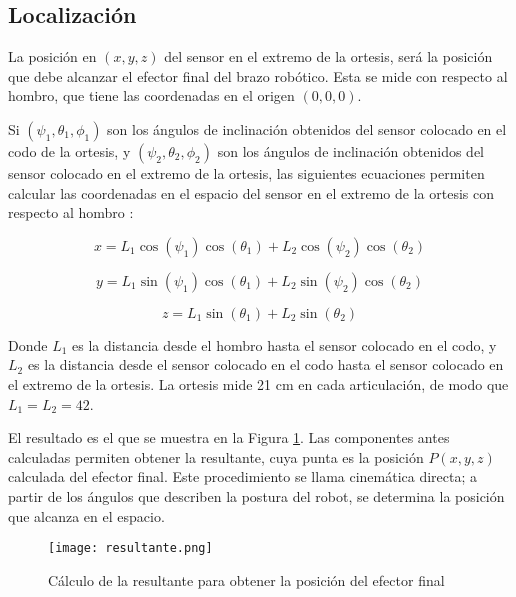 \subsection{Localización}

La posición en $(x, y, z)$ del sensor en el extremo de la ortesis, será la posición que debe alcanzar el efector final del brazo robótico. Esta se mide con respecto al hombro, que tiene las coordenadas en el origen $(0, 0 ,0)$.

Si $(\psi_{1}, \theta_{1}, \phi_{1})$ son los ángulos de inclinación obtenidos del sensor colocado en el codo de la ortesis, y $(\psi_{2}, \theta_{2}, \phi_{2})$ son los ángulos de inclinación obtenidos del sensor colocado en el extremo de la ortesis, las siguientes ecuaciones permiten calcular las coordenadas en el espacio del sensor en el extremo de la ortesis con respecto al hombro \cite{mathworks2025}:

\begin{equation}
x = L_1 \cos(\psi_1) \cos(\theta_1) + L_2 \cos(\psi_2) \cos(\theta_2)
\end{equation}

\begin{equation}
y = L_1 \sin(\psi_1) \cos(\theta_1) + L_2 \sin(\psi_2) \cos(\theta_2)
\end{equation}

\begin{equation}
z = L_1 \sin(\theta_1) + L_2 \sin(\theta_2)
\end{equation}

Donde $L_1$ es la distancia desde el hombro hasta el sensor colocado en el codo, y $L_2$ es la distancia desde el sensor colocado en el codo hasta el sensor colocado en el extremo de la ortesis. La ortesis mide 21 cm en cada articulación, de modo que $L_1 = L_2 = 42$.

El resultado es el que se muestra en la Figura \ref{fig:resultante}. Las componentes antes calculadas permiten obtener la resultante, cuya punta es la posición $P(x,y,z)$ calculada del efector final. Este procedimiento se llama cinemática directa; a partir de los ángulos que describen la postura del robot, se determina la posición que alcanza en el espacio.

\begin{figure}[htb]
	\centering
	\texttt{[image: resultante.png]}
	\caption{Cálculo de la resultante para obtener la posición del efector final}
	\label{fig:resultante}
\end{figure}
